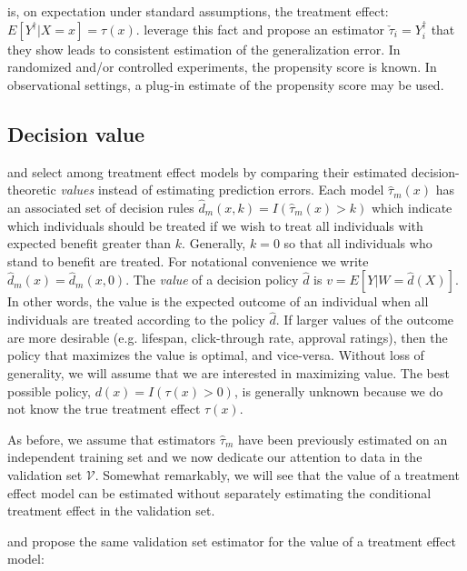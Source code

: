 is, on expectation under standard assumptions, the treatment effect: $E[Y^{\dagger}|X=x] = \tau(x)$. \citet{Gutierrez:2016tq} leverage this fact and propose an estimator $\check \tau_i = Y^{\dagger}_i$ that they show leads to consistent estimation of the generalization error. In randomized and/or controlled experiments, the propensity score is known. In observational settings, a plug-in estimate of the propensity score may be used.


\subsection{Decision value}
\label{sec:value}

\citet{Kapelner:3baXYEjR} and \citet{Zhao:2017wa} select among treatment effect models by comparing their estimated decision-theoretic \emph{values} instead of estimating prediction errors. Each model $\hat\tau_m(x)$ has an associated set of decision rules $\hat d_{m}(x,k) = I(\hat\tau_m(x) > k)$ which indicate which individuals should be treated if we wish to treat all individuals with expected benefit greater than $k$. Generally, $k=0$ so that all individuals who stand to benefit are treated. For notational convenience we write $\hat d_m(x) = \hat d_{m}(x,0)$. The \emph{value} of a decision policy $\hat d$ is $v = E[Y|W=\hat d(X)]$. In other words, the value is the expected outcome of an individual when all individuals are treated according to the policy $\hat d$. If larger values of the outcome are more desirable (e.g. lifespan, click-through rate, approval ratings), then the policy that maximizes the value is optimal, and vice-versa. Without loss of generality, we will assume that we are interested in maximizing value. The best possible policy, $d(x) = I(\tau(x) > 0)$, is generally unknown because we do not know the true treatment effect $\tau(x)$. 

As before, we assume that estimators $\hat\tau_m$ have been previously estimated on an independent training set and we now dedicate our attention to data in the validation set $\mathcal{V}$. Somewhat remarkably, we will see that the value of a treatment effect model can be estimated without separately estimating the conditional treatment effect in the validation set.

\citet{Kapelner:3baXYEjR} and \citet{Zhao:2017wa} propose the same validation set estimator for the value of a treatment effect model:

